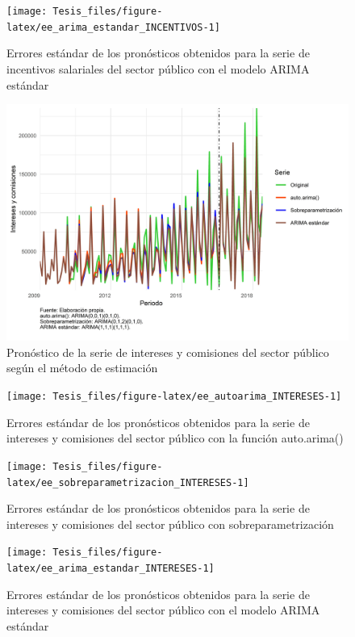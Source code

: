 \documentclass[
]{article}
\begin{document}
\begin{figure}[H]
\texttt{[image: Tesis\_files/figure-latex/ee\_arima\_estandar\_INCENTIVOS-1]} \caption{Errores estándar de los pronósticos obtenidos para la serie de incentivos salariales del sector público con el modelo ARIMA estándar}\label{fig:ee_arima_estandar_INCENTIVOS}
\end{figure}

\begin{figure}[H]
\includegraphics[width=1\linewidth,height=1\textheight]{Tesis_files/figure-latex/pronostico_INTERESES-1} \caption{Pronóstico de la serie de intereses y comisiones del sector público según el método de estimación}\label{fig:pronostico_INTERESES}
\end{figure}

\begin{figure}[H]
\texttt{[image: Tesis\_files/figure-latex/ee\_autoarima\_INTERESES-1]} \caption{Errores estándar de los pronósticos obtenidos para la serie de intereses y comisiones del sector público con la función auto.arima()}\label{fig:ee_autoarima_INTERESES}
\end{figure}

\begin{figure}[H]
\texttt{[image: Tesis\_files/figure-latex/ee\_sobreparametrizacion\_INTERESES-1]} \caption{Errores estándar de los pronósticos obtenidos para la serie de intereses y comisiones del sector público con sobreparametrización}\label{fig:ee_sobreparametrizacion_INTERESES}
\end{figure}

\begin{figure}[H]
\texttt{[image: Tesis\_files/figure-latex/ee\_arima\_estandar\_INTERESES-1]} \caption{Errores estándar de los pronósticos obtenidos para la serie de intereses y comisiones del sector público con el modelo ARIMA estándar}\label{fig:ee_arima_estandar_INTERESES}
\end{figure}
\end{document}
